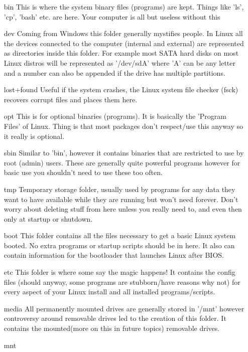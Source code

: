 \documentclass[a4paper,11pt]{report}
\begin{document}
\begin{description}
						\begin{itemize}
							\item[bin]
								This is where the system binary files (programs) are kept. Things like 'ls', 'cp', 'bash' etc. are here. Your computer is all but useless without this
							\item[dev]
							 	Coming from Windows this folder generally mystifies people. In Linux all the devices connected to the computer (internal and external) are represented as directories inside this folder.
								For example most SATA hard disks on most Linux distros will be represented as '/dev/sdA' where 'A' can be any letter and a number can also be appended if the drive has multiple partitions.
							\item[lost+found]
								Useful if the system crashes, the Linux system file checker (fsck) recovers corrupt files and places them here.
							\item[opt]
								This is for optional binaries (programs). It is basically the 'Program Files' of Linux. Thing is that most packages don't respect/use this anyway so it really is optional.
							\item[sbin]
								Similar to 'bin', however it contains binaries that are restricted to use by root (admin) users. These are generally quite powerful programs however for basic use you shouldn't need to use these too often.
							\item[tmp]
								Temporary storage folder, usually used by programs for any data they want to have available while they are running but won't need forever. Don't worry about deleting stuff from here unless you really need to, and even then only at startup or shutdown.
							\item[boot]
								This folder contains all the files necessary to get a basic Linux system booted. No extra programs or startup scripts should be in here. It also can contain information for the bootloader that launches Linux after BIOS.
							\item[etc]
								This folder is where some say the magic happens! It contains the config files (should anyway, some programs are stubborn/have reasons why not) for every aspect of your Linux install and all installed programs/scripts.
							\item[media]
								All permanently mounted drives are generally stored in '/mnt' however controversy around removable drives led to the creation of this folder. It contains the mounted(more on this in future topics) removable drives.
							\item[mnt]

\end{itemize}
\end{description}
\end{document}

